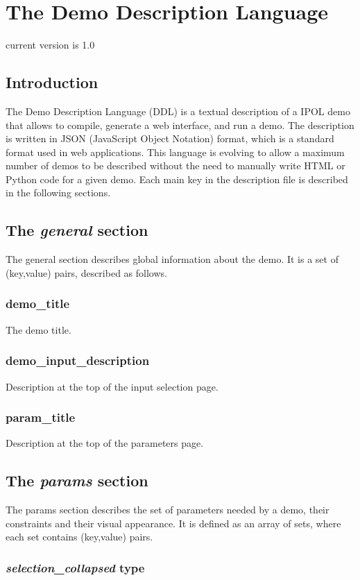 \section{The Demo Description Language}

current version is 1.0

\subsection{Introduction}
The Demo Description Language (DDL) is a textual description of a IPOL demo that 
allows to compile, generate a web interface, and run a demo. The description is 
written in JSON (JavaScript Object Notation) format, which is a standard format 
used in web applications. This language is evolving to allow a maximum number 
of demos to be described without the need to manually write HTML or Python code 
for a given demo. Each main key in the description file is described in the 
following sections.

\subsection{The \emph{general} section}
The general section describes global information about the demo. It is a set of 
(key,value) pairs, described as follows.
\subsubsection{demo\_title}
The demo title.
\subsubsection{demo\_input\_description}
Description at the top of the input selection page.
\subsubsection{param\_title}
Description at the top of the parameters page.

\subsection{The \emph{params} section}
The params section describes the set of parameters needed by a demo, their 
constraints and their visual appearance. It is defined as an array of sets, 
where each set contains (key,value) pairs.

\subsubsection{ \emph{selection\_collapsed} type}
